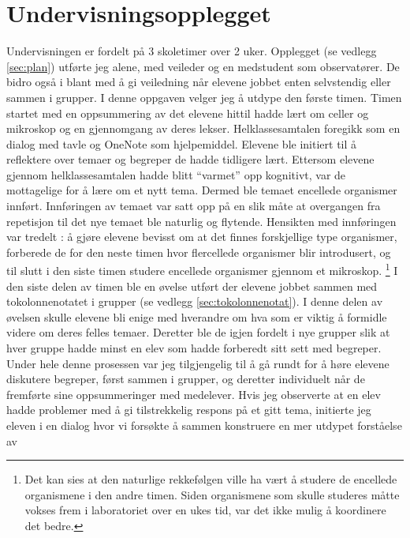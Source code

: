\documentclass[main.tex]{subfiles}
\begin{document}
\section*{Undervisningsopplegget}
\label{sec:1}
Undervisningen er fordelt på 3 skoletimer over 2 uker. Opplegget (se vedlegg \ref{sec:plan}) 
utførte jeg alene, med veileder og en medstudent som observatører. De bidro også i blant 
med å gi veiledning når elevene jobbet enten selvstendig eller sammen i grupper. I denne 
oppgaven velger jeg å utdype den første timen. 
\newline
\newline
Timen startet med en oppsummering av det elevene hittil hadde lært om celler og mikroskop og en 
gjennomgang av deres lekser. Helklassesamtalen foregikk som en dialog med tavle og OneNote som hjelpemiddel. 
Elevene ble initiert til å reflektere over temaer og begreper de hadde tidligere lært. Ettersom elevene gjennom 
helklassesamtalen hadde blitt ``varmet'' opp kognitivt, var de mottagelige for å lære om et nytt tema. 
Dermed ble temaet encellede organismer innført. Innføringen av temaet var satt opp på en slik 
måte at overgangen fra repetisjon til det nye temaet ble naturlig og flytende. Hensikten med 
innføringen var tredelt : å gjøre elevene bevisst om at det finnes forskjellige type organismer, 
forberede de for den neste timen hvor flercellede organismer blir introdusert, og 
til slutt i den siste timen studere encellede organismer gjennom et mikroskop. \footnote[2]{Det kan sies 
at den naturlige rekkefølgen ville ha vært å studere de encellede organismene i den andre timen. 
Siden organismene som skulle studeres måtte vokses frem i laboratoriet over en ukes tid, var det ikke 
mulig å koordinere det bedre.}
\newline
\newline
I den siste delen av timen ble en øvelse utført der elevene jobbet sammen med tokolonnenotatet i 
grupper (se vedlegg \ref{sec:tokolonnenotat}). I denne delen av øvelsen skulle elevene bli enige med 
hverandre om hva som er viktig å formidle videre om deres felles temaer. Deretter ble de igjen fordelt 
i nye grupper slik at hver gruppe hadde minst en elev som hadde forberedt sitt sett med begreper. 
Under hele denne prosessen var jeg tilgjengelig til å gå rundt for å høre elevene diskutere begreper, 
først sammen i grupper, og deretter individuelt når de fremførte sine oppsummeringer med medelever. 
Hvis jeg observerte at en elev hadde problemer med å gi tilstrekkelig respons på et gitt tema, 
initierte jeg eleven i en dialog hvor vi forsøkte å sammen konstruere en mer utdypet forståelse av 
\end{document}
